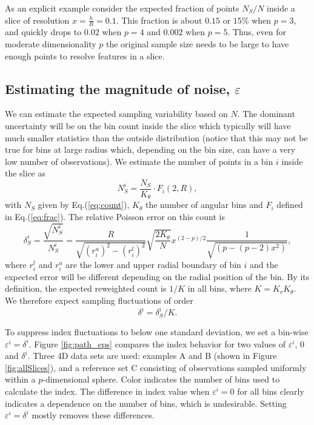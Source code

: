 \documentclass[]{interact}
\theoremstyle{plain}%
\theoremstyle{definition}
\theoremstyle{remark}
\begin{document}
As an explicit example consider the expected fraction of points
\(N_S/N\) inside a slice of resolution \(x=\frac{h}{R}=0.1\). This
fraction is about \(0.15\) or \(15\%\) when \(p=3\), and quickly drops
to \(0.02\) when \(p=4\) and \(0.002\) when \(p=5\). Thus, even for
moderate dimensionality \(p\) the original sample size needs to be large
to have enough points to resolve features in a slice.

\hypertarget{estimating-the-magnitude-of-noise-varepsilon}{%
\subsection{\texorpdfstring{Estimating the magnitude of noise,
\(\varepsilon\)
\label{sec:epsilon}}{Estimating the magnitude of noise, \textbackslash varepsilon }}\label{estimating-the-magnitude-of-noise-varepsilon}}

We can estimate the expected sampling variability based on \(N\). The
dominant uncertainty will be on the bin count inside the slice which
typically will have much smaller statistics than the outside
distribution (notice that this may not be true for bins at large radius
which, depending on the bin size, can have a very low number of
observations). We estimate the number of points in a bin \(i\) inside
the slice as \begin{equation}
N_S^i = \frac{N_S}{K_{\theta}} \cdot F_i(2, R),
\end{equation} with \(N_S\) given by Eq.(\ref{eq:count}), \(K_{\theta}\)
the number of angular bins and \(F_i\) defined in Eq.(\ref{eq:frac}).
The relative Poisson error on this count is \begin{equation}
\delta_S^i = \frac{\sqrt{N_S^i}}{N_S^i} = 
\frac{R}{\sqrt{(r_i^u)^2 - (r_i^l)^2}} \sqrt{\frac{2 K_{\theta}}{N}} x^{(2-p)/2}
\frac{1}{\sqrt{\left(p - (p-2) x^{2}\right)}}, 
\end{equation} where \(r_i^l\) and \(r_i^u\) are the lower and upper
radial boundary of bin \(i\) and the expected error will be different
depending on the radial position of the bin. By its definition, the
expected reweighted count is \(1/K\) in all bins, where
\(K=K_r K_{\theta}\). We therefore expect sampling fluctuations of order
\begin{equation}
\delta^i = \delta_S^i / K. 
\label{eq:eps}
\end{equation}

To suppress index fluctuations to below one standard deviation, we set a
bin-wise \(\varepsilon^i = \delta^i\). Figure \ref{fig:path_eps}
compares the index behavior for two values of \(\varepsilon^i\), \(0\)
and \(\delta^i\). Three 4D data sets are used: examples A and B (shown
in Figure \ref{fig:allSlices}), and a reference set C consisting of
observations sampled uniformly within a \(p\)-dimensional sphere. Color
indicates the number of bins used to calculate the index. The difference
in index value when \(\varepsilon^i=0\) for all bins clearly indicates a
dependence on the number of bins, which is undesirable. Setting
\(\varepsilon^i = \delta^i\) mostly removes these differences.
\end{document}
